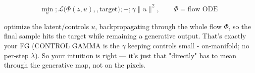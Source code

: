 \documentclass[a4paper,12pt]{article}
\begin{document}
$$\min_{u}; \mathcal L\big(\Phi(z, u),,\text{target}\big);+;\gamma\lVert u\rVert^2,\qquad \Phi=\text{flow ODE}$$

optimize the latent/controls $u$, backpropagating through the whole flow $\Phi$, so the final sample hits the target while remaining a generative output. That's exactly your FG (CONTROL GAMMA is the $\gamma$ keeping controls small - on-manifold; no per-step $\lambda$). So your intuition is right — it's just that "directly" has to mean through the generative map, not on the pixels.



% 
% 
\end{document}

